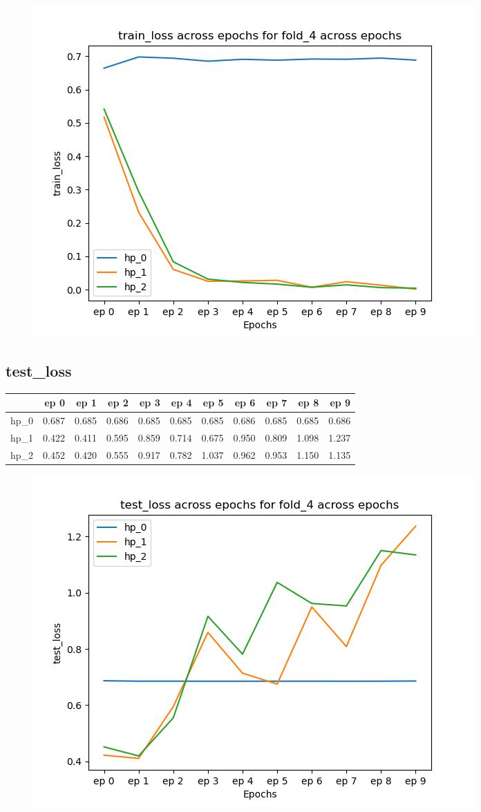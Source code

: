 \documentclass{article}
\begin{document}
\begin{figure}[H]
\includegraphics[scale = 0.75]{fold_4/train_loss}
\end{figure}
\subsection{test\_loss}
\begin{tabular}{lrrrrrrrrrr}
\toprule
{} &   ep 0 &   ep 1 &   ep 2 &   ep 3 &   ep 4 &   ep 5 &   ep 6 &   ep 7 &   ep 8 &   ep 9 \\
\midrule
hp\_0 &  0.687 &  0.685 &  0.686 &  0.685 &  0.685 &  0.685 &  0.686 &  0.685 &  0.685 &  0.686 \\
hp\_1 &  0.422 &  0.411 &  0.595 &  0.859 &  0.714 &  0.675 &  0.950 &  0.809 &  1.098 &  1.237 \\
hp\_2 &  0.452 &  0.420 &  0.555 &  0.917 &  0.782 &  1.037 &  0.962 &  0.953 &  1.150 &  1.135 \\
\bottomrule
\end{tabular}

\begin{figure}[H]
\includegraphics[scale = 0.75]{fold_4/test_loss}
\end{figure}
\end{document}
